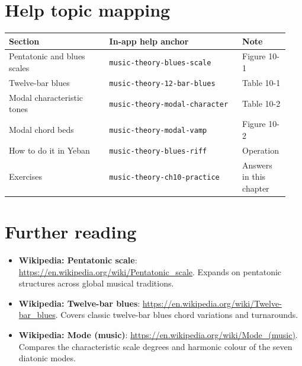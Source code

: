 \section{Help topic mapping}
\begin{center}
\footnotesize
\setlength{\tabcolsep}{3pt}
\begin{longtable}{p{0.34\linewidth}p{0.45\linewidth}p{0.15\linewidth}}
\toprule
Section & In-app help anchor & Note \\
\midrule
\endhead
Pentatonic and blues scales & \texttt{music-theory-blues-scale} & Figure 10-1 \\
Twelve-bar blues & \texttt{music-theory-12-bar-blues} & Table 10-1 \\
Modal characteristic tones & \texttt{music-theory-modal-character} & Table 10-2 \\
Modal chord beds & \texttt{music-theory-modal-vamp} & Figure 10-2 \\
How to do it in Yeban & \texttt{music-theory-blues-riff} & Operation \\
Exercises & \texttt{music-theory-ch10-practice} & Answers in this chapter \\
\bottomrule
\end{longtable}
\end{center}

\section*{Further reading}
\begin{itemize}
  \item \textbf{Wikipedia: Pentatonic scale}: \url{https://en.wikipedia.org/wiki/Pentatonic_scale}. Expands on pentatonic structures across global musical traditions.
  \item \textbf{Wikipedia: Twelve-bar blues}: \url{https://en.wikipedia.org/wiki/Twelve-bar_blues}. Covers classic twelve-bar blues chord variations and turnarounds.
  \item \textbf{Wikipedia: Mode (music)}: \url{https://en.wikipedia.org/wiki/Mode_(music)}. Compares the characteristic scale degrees and harmonic colour of the seven diatonic modes.
\end{itemize}
